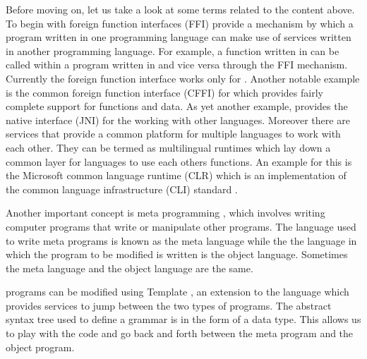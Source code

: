 \documentclass[thesis-solanki.tex]{subfiles}
\begin{document}
Before moving on, let us take a look at some terms related to the content above.
To begin with foreign function interfaces (FFI) \cite{website:ffiwiki} provide a mechanism by which a program
written in one programming language can make use of services written in another programming language.
For example, a function
written in  can be called within a program written in  and vice versa through the FFI
mechanism.
Currently the  foreign function interface works only for .
Another notable example is the common foreign function interface (CFFI) \cite{website:commonlisp} for
 which provides fairly complete support for  functions and data.
As yet another example,  provides the  native interface (JNI) for the working with other
languages.
Moreover there are services that provide a common platform for multiple languages to work with each other.
They can be termed as multilingual runtimes
which lay down a common layer for languages to use each others functions.
An example for this is the Microsoft common language runtime (CLR) \cite{website:clrwiki} which is an
implementation of the common language infrastructure (CLI) standard \cite{website:cliwiki}.

Another important concept is meta programming \cite{website:metaprogwiki}, which involves writing computer programs
that write or manipulate other programs.
The language used to write meta programs is known as the meta language while the the language in which the program
to be modified is written is the object language.
Sometimes the meta language and the object language are the same.

 programs can be modified using Template  \cite{website:templatehaskell}, an
extension to the language which provides services to jump between the two types of programs.
The abstract syntax tree used to define a grammar is in the form of a  data type.
This allows us to play with the code and go back and forth between the meta program and the object program.
\end{document}
